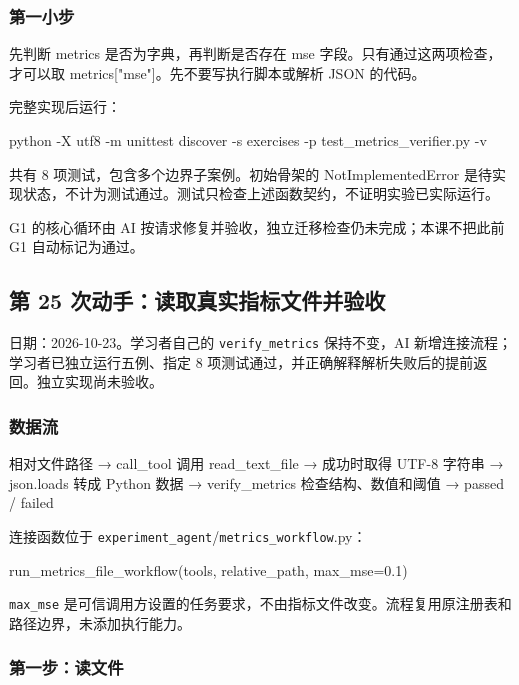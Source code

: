 \documentclass[UTF8,zihao=-4,fontset=fandol]{ctexart}
\begin{document}
\subsubsection{第一小步}

先判断 metrics 是否为字典，再判断是否存在 mse 字段。只有通过这两项检查，才可以取 metrics["mse"]。先不要写执行脚本或解析 JSON 的代码。

完整实现后运行：

\begin{Code}
python -X utf8 -m unittest discover -s exercises -p test_metrics_verifier.py -v
\end{Code}

共有 8 项测试，包含多个边界子案例。初始骨架的 NotImplementedError 是待实现状态，不计为测试通过。测试只检查上述函数契约，不证明实验已实际运行。

G1 的核心循环由 AI 按请求修复并验收，独立迁移检查仍未完成；本课不把此前 G1 自动标记为通过。

\subsection{第 25 次动手：读取真实指标文件并验收}

日期：2026-10-23。学习者自己的 \nolinkurl{verify_metrics} 保持不变，AI 新增连接流程；学习者已独立运行五例、指定 8 项测试通过，并正确解释解析失败后的提前返回。独立实现尚未验收。

\subsubsection{数据流}

\begin{Code}
相对文件路径
  → call_tool 调用 read_text_file
  → 成功时取得 UTF-8 字符串
  → json.loads 转成 Python 数据
  → verify_metrics 检查结构、数值和阈值
  → passed / failed
\end{Code}

连接函数位于 \nolinkurl{experiment_agent}/\nolinkurl{metrics_workflow}.py：

\begin{Code}
run_metrics_file_workflow(tools, relative_path, max_mse=0.1)
\end{Code}

\nolinkurl{max_mse} 是可信调用方设置的任务要求，不由指标文件改变。流程复用原注册表和路径边界，未添加执行能力。

\subsubsection{第一步：读文件}
\end{document}
